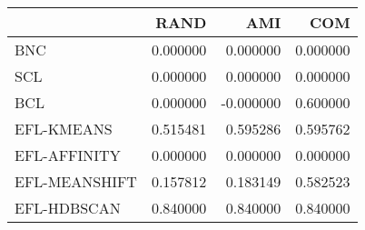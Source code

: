 \begin{tabular}{lrrr}
\toprule
 & RAND & AMI & COM \\
\midrule
BNC & 0.000000 & 0.000000 & 0.000000 \\
SCL & 0.000000 & 0.000000 & 0.000000 \\
BCL & 0.000000 & -0.000000 & 0.600000 \\
EFL-KMEANS & 0.515481 & 0.595286 & 0.595762 \\
EFL-AFFINITY & 0.000000 & 0.000000 & 0.000000 \\
EFL-MEANSHIFT & 0.157812 & 0.183149 & 0.582523 \\
EFL-HDBSCAN & 0.840000 & 0.840000 & 0.840000 \\
\bottomrule
\end{tabular}
